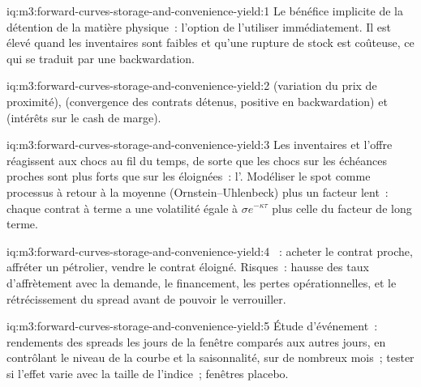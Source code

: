 \begin{solution}{iq:m3:forward-curves-storage-and-convenience-yield:1}
Le bénéfice implicite de la détention de la matière physique~: l'option de l'utiliser immédiatement. Il est élevé quand
les inventaires sont faibles et qu'une rupture de stock est coûteuse, ce qui se traduit par une backwardation.
\end{solution}

\begin{solution}{iq:m3:forward-curves-storage-and-convenience-yield:2}
 (variation du prix de proximité),  (convergence des contrats détenus, positive en
backwardation) et  (intérêts sur le cash de marge).
\end{solution}

\begin{solution}{iq:m3:forward-curves-storage-and-convenience-yield:3}
Les inventaires et l'offre réagissent aux chocs au fil du temps, de sorte que les chocs sur les échéances proches sont plus forts que sur les éloignées~:
l'. Modéliser le spot comme processus à retour à la moyenne (Ornstein--Uhlenbeck) plus un facteur lent~: chaque
contrat à terme a une volatilité égale à $\sigma e^{-\kappa\tau}$ plus celle du facteur de long terme.
\end{solution}

\begin{solution}{iq:m3:forward-curves-storage-and-convenience-yield:4}
~: acheter le contrat proche, affréter un pétrolier, vendre le contrat éloigné. Risques~: hausse des taux d'affrètement avec la demande,
le financement, les pertes opérationnelles, et le rétrécissement du spread avant de pouvoir le verrouiller.
\end{solution}

\begin{solution}{iq:m3:forward-curves-storage-and-convenience-yield:5}
Étude d'événement~: rendements des spreads les jours de la fenêtre comparés aux autres jours, en contrôlant le niveau de la courbe et
la saisonnalité, sur de nombreux mois~; tester si l'effet varie avec la taille de l'indice~; fenêtres placebo.
\end{solution}


